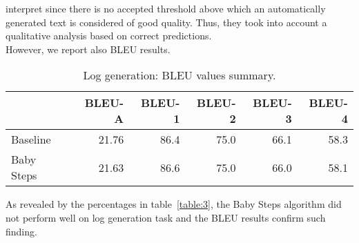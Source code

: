 interpret since there is no accepted threshold above which an automatically generated text is considered of 
good quality. Thus, they took into account a qualitative analysis based on correct predictions.\\
However, we report also BLEU results.
\begin{table}[h!]
    \centering
    \begin{tabular}{l|r|r|r|r|r}
     & BLEU-A & BLEU-1 & BLEU-2 & BLEU-3 & BLEU-4\\ [0.5ex] 
     \hline
     Baseline & 21.76 & 86.4 & 75.0 & 66.1 & 58.3\\  
     Baby Steps & 21.63 & 86.6 & 75.0 & 66.0 & 58.1\\ [1ex]
     \end{tabular}
    \caption{Log generation: BLEU values summary.}
    \label{table:4}
\end{table}
As revealed by the percentages in table~\ref{table:3}, the Baby Steps algorithm did not perform well
on log generation task and the BLEU results confirm such finding.